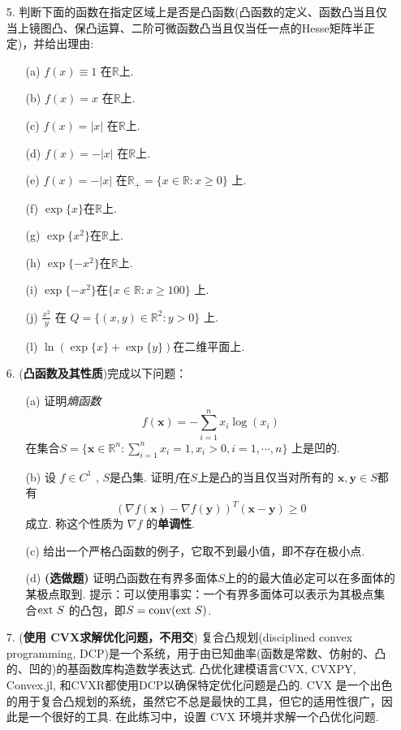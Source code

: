 \documentclass[a4paper,12pt]{ctexart}
\def\R{{\mathbb R}}%
\newcommand\bx{{\bm x}}
\newcommand\by{{\bm y}}
\begin{document}
\begin{enumerate}
\item[5.] 判断下面的函数在指定区域上是否是凸函数(凸函数的定义、函数凸当且仅当上镜图凸、保凸运算、二阶可微函数凸当且仅当任一点的Hesse矩阵半正定)，并给出理由:
\begin{enumerate}
    \item[(a)] $f(x)\equiv1$ 在$\R$上.
    \item[(b)] $f(x)=x$ 在$\R$上.
    \item[(c)] $f(x)=|x|$ 在$\R$上.
    \item[(d)] $f(x)=-|x|$ 在$\R$上.
    \item[(e)] $f(x)=-|x|$ 在$\R_+=\{x\in\R: x\geq0\}$ 上.
    \item[(f)] $\exp\{x\}$在$\R$上.
    \item[(g)] $\exp\{x^2\}$在$\R$上.
    \item[(h)] $\exp\{-x^2\}$在$\R$上.
    \item[(i)] $\exp\{-x^2\}$在$\{x\in\R: x\geq100\}$ 上.
    \item[(j)] $\frac{x^2}{y}$ 在 $Q=\{(x,y)\in\R^2:y>0\}$ 上.
    \item[(l)] $\ln(\exp\{x\}+\exp\{y\})$在二维平面上.
\end{enumerate}

\item [6.] ({\bf 凸函数及其性质})完成以下问题：
    \begin{enumerate}
    \item [(a)] 证明{\it 熵函数}
$$
f(\bx) = -\sum_{i=1}^n x_i \log(x_i)
$$
在集合$S = \{\bx \in \R^n : \sum_{i=1}^n x_i = 1, x_i>0,i=1,\cdots,n\}$ 上是凹的.

    \item [(b)] 设 $f\in C^1$ , $S$是凸集. 证明$f$在$S$上是凸的当且仅当对所有的 $\bx,\by\in S$都有
$$
(\nabla f(\bx) - \nabla f(\by))^T (\bx-\by) \geq 0
$$
成立. 称这个性质为 $\nabla f$ 的{\bf 单调性}.

    \item [(c)] 给出一个严格凸函数的例子，它取不到最小值，即不存在极小点.

    \item [(d)]{\bf (选做题)} 证明凸函数在有界多面体$S$上的的最大值必定可以在多面体的某极点取到. 提示：可以使用事实：一个有界多面体可以表示为其极点集合${\rm ext}\ S$ 的凸包，即$S={\rm conv} ({\rm ext}\ S)$.
    \end{enumerate}

\item [7.]({\bf 使用 CVX求解优化问题，不用交})
复合凸规划(disciplined convex programming, DCP)是一个系统，用于由已知曲率(函数是常数、仿射的、凸的、凹的)的基函数库构造数学表达式.  凸优化建模语言CVX, CVXPY, Convex.jl, 和CVXR都使用DCP以确保特定优化问题是凸的. CVX 是一个出色的用于复合凸规划的系统，虽然它不总是最快的工具，但它的适用性很广，因此是一个很好的工具. 在此练习中，设置 CVX 环境并求解一个凸优化问题.


\end{enumerate}
\end{document}
